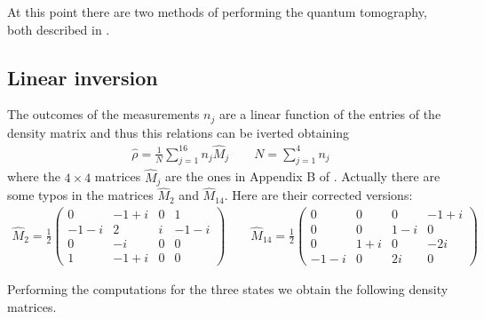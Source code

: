 \documentclass[a4paper, 11pt]{article}
\begin{document}
    At this point there are two methods of performing the quantum tomography, both described in \cite{rif:tomo}.

    \subsection{Linear inversion}
      The outcomes of the measurements $n_j$ are a linear function of the entries of the density matrix and thus this relations can be iverted obtaining
      \begin{gather*}
        \hat{\rho} = \frac{1}{N}\sum_{j = 1}^{16} n_j \hat{M}_j
        \qquad N = \sum_{j = 1}^4 n_j
      \end{gather*}
      where the $4 \times 4$ matrices $\hat{M}_j$ are the ones in Appendix B of \cite{rif:tomo}. Actually there are some typos in the matrices $\hat{M}_2$ and $\hat{M}_{14}$. Here are their corrected versions:
      \begin{gather*}
        \hat{M}_2 = \frac{1}{2}
        \begin{pmatrix}
          0 & -1 + i & 0 & 1 \\
          -1 - i & 2 & i & -1 -i \\
          0 & -i & 0 & 0 \\
          1 & -1 + i & 0 & 0
        \end{pmatrix}
        \qquad
        \hat{M}_{14} = \frac{1}{2}
        \begin{pmatrix}
          0 & 0 & 0 & -1 + i \\
          0 & 0 & 1 - i & 0 \\
          0 & 1 + i & 0 & -2i \\
          -1 -i & 0 & 2i & 0
        \end{pmatrix}
      \end{gather*}

      Performing the computations for the three states we obtain the following density matrices.
\end{document}
